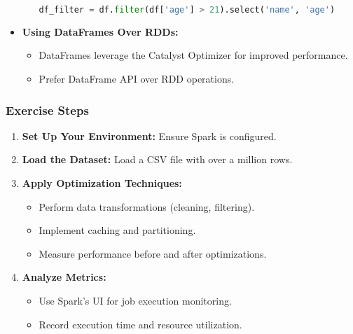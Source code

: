 \documentclass[aspectratio=169]{beamer}
\begin{document}
\begin{frame}[fragile]
\begin{itemize}
\begin{itemize}
                \begin{lstlisting}[language=Python]
df_filter = df.filter(df['age'] > 21).select('name', 'age')
                \end{lstlisting}
            \end{itemize}
        \item \textbf{Using DataFrames Over RDDs:}
            \begin{itemize}
                \item DataFrames leverage the Catalyst Optimizer for improved performance.
                \item Prefer DataFrame API over RDD operations.
            \end{itemize}
    \end{itemize}
\end{frame}

\begin{frame}[fragile]
    \frametitle{Exercise Steps}
    \begin{enumerate}
        \item \textbf{Set Up Your Environment:} Ensure Spark is configured.
        \item \textbf{Load the Dataset:} Load a CSV file with over a million rows.
        \item \textbf{Apply Optimization Techniques:}
            \begin{itemize}
                \item Perform data transformations (cleaning, filtering).
                \item Implement caching and partitioning.
                \item Measure performance before and after optimizations.
            \end{itemize}
        \item \textbf{Analyze Metrics:}
            \begin{itemize}
                \item Use Spark's UI for job execution monitoring.
                \item Record execution time and resource utilization.
            \end{itemize}
    \end{enumerate}
\end{frame}
\end{document}
